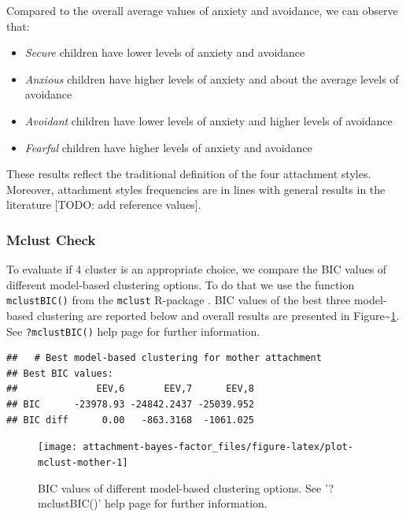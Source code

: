 \documentclass[
]{book}
\providecommand{\tightlist}{%
  \setlength{\itemsep}{0pt}\setlength{\parskip}{0pt}}
\begin{document}
Compared to the overall average values of anxiety and avoidance, we can observe that:

\begin{itemize}
\tightlist
\item
  \emph{Secure} children have lower levels of anxiety and avoidance
\item
  \emph{Anxious} children have higher levels of anxiety and about the average levels of avoidance
\item
  \emph{Avoidant} children have lower levels of anxiety and higher levels of avoidance
\item
  \emph{Fearful} children have higher levels of anxiety and avoidance
\end{itemize}

These results reflect the traditional definition of the four attachment styles. Moreover, attachment styles frequencies are in lines with general results in the literature {[}TODO: add reference values{]}.

\hypertarget{mclust-check}{%
\subsubsection*{Mclust Check}\label{mclust-check}}

To evaluate if 4 cluster is an appropriate choice, we compare the BIC values of different model-based clustering options. To do that we use the function \texttt{mclustBIC()} from the \texttt{mclust} R-package \citep{scruccaMclustClusteringClassification2016}. BIC values of the best three model-based clustering are reported below and overall results are presented in Figure\textasciitilde\ref{fig:plot-mclust-mother}. See \texttt{?mclustBIC()} help page for further information.

\begin{verbatim}
##   # Best model-based clustering for mother attachment
## Best BIC values:
##              EEV,6       EEV,7      EEV,8
## BIC      -23978.93 -24842.2437 -25039.952
## BIC diff      0.00   -863.3168  -1061.025
\end{verbatim}

\begin{figure}

{\centering \texttt{[image: attachment-bayes-factor\_files/figure-latex/plot-mclust-mother-1]} 

}

\caption{BIC values of different model-based clustering options. See '?mclustBIC()' help page for further information.}\label{fig:plot-mclust-mother}
\end{figure}
\end{document}
